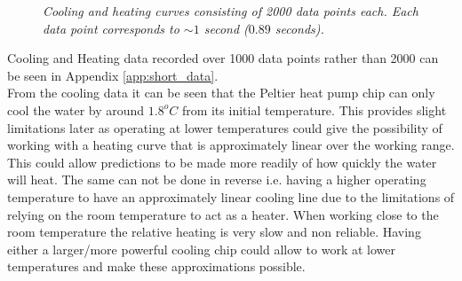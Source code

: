 \documentclass[10pt]{article}
\begin{document}
\begin{figure}[h!]
    \centering
    \qquad
    \caption{\it{Cooling and heating curves consisting of 2000 data points each. Each data point corresponds to $\sim 1$ second ($0.89$ seconds). }}%
    \label{fig:heat_and_cool_curve}%
\end{figure}

Cooling and Heating data recorded over 1000 data points rather than 2000 can be seen in Appendix \ref{app:short_data}.\\

From the cooling data it can be seen that the Peltier heat pump chip can only cool the water by around $1.8^oC$ from its initial temperature. This provides slight limitations later as operating at lower temperatures could give the possibility of working with a heating curve that is approximately linear over the working range. This could allow predictions to be made more readily of how quickly the water will heat. The same can not be done in reverse i.e. having a higher operating temperature to have an approximately linear cooling line due to the limitations of relying on the room temperature to act as a heater. When working close to the room temperature the relative heating is very slow and non reliable. Having either a larger/more powerful cooling chip could allow to work at lower temperatures and make these approximations possible. \\
\end{document}
